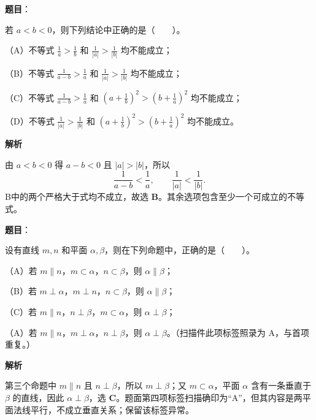 \begin{answer}

\textbf{题目}：

若 $a<b<0$，则下列结论中正确的是\mbox{（　　）}。

（A）不等式 $\frac1a>\frac1b$ 和 $\frac1{|a|}>\frac1{|b|}$ 均不能成立；

（B）不等式 $\frac1{a-b}>\frac1a$ 和 $\frac1{|a|}>\frac1{|b|}$ 均不能成立；

（C）不等式 $\frac1{a-b}>\frac1a$ 和 $\left(a+\frac1b\right)^2>\left(b+\frac1a\right)^2$ 均不能成立；

（D）不等式 $\frac1{|a|}>\frac1{|b|}$ 和 $\left(a+\frac1b\right)^2>\left(b+\frac1a\right)^2$ 均不能成立。

\textbf{解析}

由 $a<b<0$ 得 $a-b<0$ 且 $|a|>|b|$，所以
\nopagebreak[4]
\[
\frac1{a-b}<\frac1a,\qquad \frac1{|a|}<\frac1{|b|}.
\]
B中的两个严格大于式均不成立，故选 \textbf{B}。其余选项包含至少一个可成立的不等式。


\end{answer}
\begin{answer}

\textbf{题目}：

设有直线 $m,n$ 和平面 $\alpha,\beta$，则在下列命题中，正确的是\mbox{（　　）}。

（A）若 $m\parallel n$，$m\subset\alpha$，$n\subset\beta$，则 $\alpha\parallel\beta$；

（B）若 $m\perp\alpha$，$m\perp n$，$n\subset\beta$，则 $\alpha\parallel\beta$；

（C）若 $m\parallel n$，$n\perp\beta$，$m\subset\alpha$，则 $\alpha\perp\beta$；

（A）若 $m\parallel n$，$m\perp\alpha$，$n\perp\beta$，则 $\alpha\perp\beta$。（扫描件此项标签照录为 A，与首项重复。）

\textbf{解析}

第三个命题中 $m\parallel n$ 且 $n\perp\beta$，所以 $m\perp\beta$；又 $m\subset\alpha$，平面 $\alpha$ 含有一条垂直于 $\beta$ 的直线，因此 $\alpha\perp\beta$，选 \textbf{C}。题面第四项标签扫描确印为“A”，但其内容是两平面法线平行，不成立垂直关系；保留该标签异常。


\end{answer}

